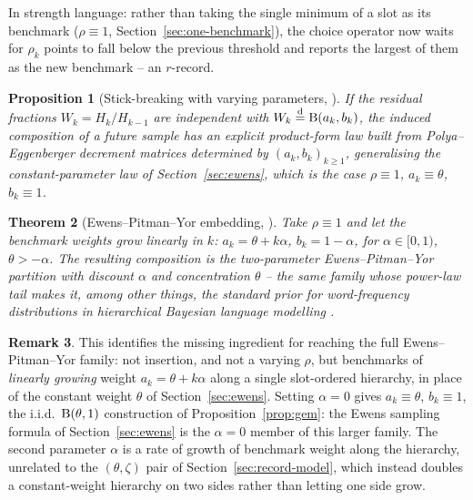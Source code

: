 \documentclass[11pt]{article}
\theoremstyle{plain}
\newtheorem{theorem}{Theorem}[section]
\newtheorem{proposition}[theorem]{Proposition}
\theoremstyle{definition}
\newtheorem{remark}[theorem]{Remark}
\begin{document}
In strength language: rather than taking the single minimum of a slot as its benchmark (\(\rho\equiv1\), Section~\ref{sec:one-benchmark}), the choice operator now waits for \(\rho_k\) points to fall below the previous threshold and reports the largest of them as the new benchmark -- an \(r\)-record.

\begin{proposition}[Stick-breaking with varying parameters, {\cite[eqs.~(6)--(8)]{GnedinConstrained2006}}]
\label{prop:constrained-stick}
If the residual fractions \(W_k=H_k/H_{k-1}\) are independent with \(W_k\stackrel{\rm d}{=}{\rm B}(a_k,b_k)\), the induced composition of a future sample has an explicit product-form law built from Polya--Eggenberger decrement matrices determined by \((a_k,b_k)_{k\ge1}\), generalising the constant-parameter law of Section~\ref{sec:ewens}, which is the case \(\rho\equiv1\), \(a_k\equiv\theta\), \(b_k\equiv1\).
\end{proposition}

\begin{theorem}[Ewens--Pitman--Yor embedding, {\cite[\S6]{GnedinConstrained2006}}]
\label{thm:ewens-pitman}
Take \(\rho\equiv1\) and let the benchmark weights grow linearly in \(k\): \(a_k=\theta+k\alpha\), \(b_k=1-\alpha\), for \(\alpha\in[0,1)\), \(\theta>-\alpha\). The resulting composition is the two-parameter Ewens--Pitman--Yor partition with discount \(\alpha\) and concentration \(\theta\) -- the same family whose power-law tail makes it, among other things, the standard prior for word-frequency distributions in hierarchical Bayesian language modelling \cite{teh2006hierarchical}.
\end{theorem}

\begin{remark}
This identifies the missing ingredient for reaching the full Ewens--Pitman--Yor family: not insertion, and not a varying \(\rho\), but benchmarks of \emph{linearly growing} weight \(a_k=\theta+k\alpha\) along a single slot-ordered hierarchy, in place of the constant weight \(\theta\) of Section~\ref{sec:ewens}. Setting \(\alpha=0\) gives \(a_k\equiv\theta\), \(b_k\equiv1\), the i.i.d.\ \({\rm B}(\theta,1)\) construction of Proposition~\ref{prop:gem}: the Ewens sampling formula of Section~\ref{sec:ewens} is the \(\alpha=0\) member of this larger family. The second parameter \(\alpha\) is a rate of growth of benchmark weight along the hierarchy, unrelated to the \((\theta,\zeta)\) pair of Section~\ref{sec:record-model}, which instead doubles a constant-weight hierarchy on two sides rather than letting one side grow.
\end{remark}
\end{document}
